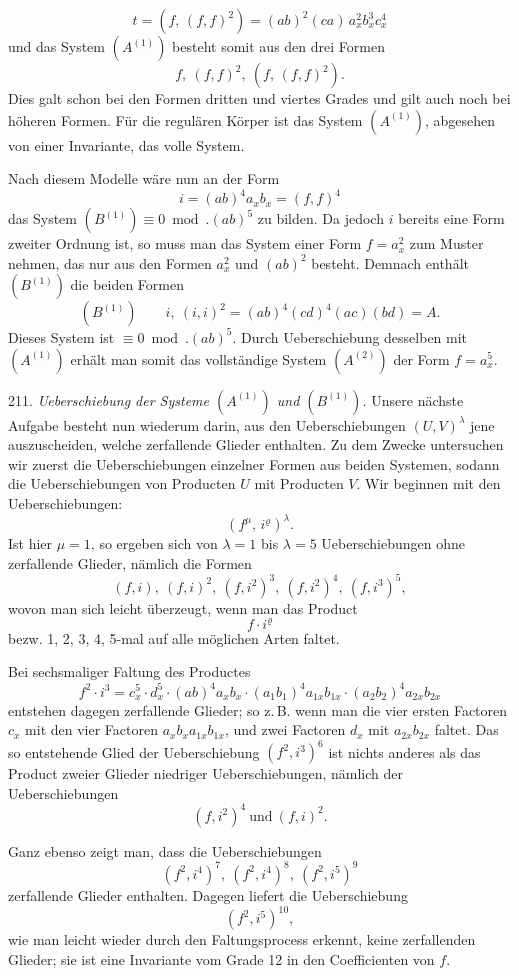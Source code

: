 \[
t = (f,\, (f,f)^2) = (ab)^2(ca)\, a_x^2 b_x^3 c_x^4
\]
und das System $(A^{(1)})$ besteht somit aus den drei Formen
\[
f,\ (f,f)^2,\ (f,\,(f,f)^2).
\]
Dies galt schon bei den Formen dritten und viertes Grades und %
gilt auch noch bei h\"oheren Formen. F\"ur die regul\"aren K\"orper ist
das System $(A^{(1)})$, abgesehen von einer Invariante, das volle System.

Nach diesem Modelle w\"are nun an der Form
\[
i = (ab)^4 a_x b_x = (f,f)^4
\]
das System $(B^{(1)}) \equiv 0 \bmod. (ab)^5$ zu bilden. Da jedoch $i$ bereits eine
Form zweiter Ordnung ist, so muss man das System einer Form
$f = a_x^2$ zum Muster nehmen, das nur aus den Formen $a_x^2$ und $(ab)^2$
besteht. Demnach enth\"alt $(B^{(1)})$ die beiden Formen
\[
(B^{(1)}) \qquad i,\ (i,i)^2 = (ab)^4(cd)^4(ac)(bd) = A.
\]
Dieses System ist $\equiv 0 \bmod. (ab)^5$. Durch Ueberschiebung desselben
 mit $(A^{(1)})$ erh\"alt man somit das vollst\"andige System $(A^{(2)})$ der
Form $f = a_x^5$.

211. \textit{Ueberschiebung der Systeme $(A^{(1)})$ und $(B^{(1)})$.} Unsere n\"achste
Aufgabe besteht nun wiederum darin, aus den Ueberschiebungen
$(U,V)^\lambda$ jene auszuscheiden, welche zerfallende Glieder enthalten. Zu
dem Zwecke untersuchen wir zuerst die Ueberschiebungen einzelner
Formen aus beiden Systemen, sodann die Ueberschiebungen von Producten
 $U$ mit Producten $V$. Wir beginnen mit den Ueberschiebungen:
\[
(f^\mu,\, i^\varrho)^\lambda.
\]
Ist hier $\mu = 1$, so ergeben sich von $\lambda = 1$ bis $\lambda = 5$ Ueberschiebungen
 ohne zerfallende Glieder, n\"amlich die Formen
\[
(f,i),\ (f,i)^2,\ (f,i^2)^3,\ (f,i^2)^4,\ (f,i^3)^5,
\]
wovon man sich leicht \"uberzeugt, wenn man das Product
\[
f \cdot i^\varrho
\]
bezw. 1, 2, 3, 4, 5-mal auf alle m\"oglichen Arten faltet.

Bei sechsmaliger Faltung des Productes
\[
f^2 \cdot i^3 = c_x^5 \cdot d_x^5 \cdot (ab)^4 a_x b_x \cdot (a_1 b_1)^4 a_{1x} b_{1x} \cdot (a_2 b_2)^4 a_{2x} b_{2x}
\]
entstehen dagegen zerfallende Glieder; so z.\,B. wenn man die vier ersten
Factoren $c_x$ mit den vier Factoren $a_x b_x a_{1x} b_{1x}$, und zwei Factoren $d_x$
mit $a_{2x} b_{2x}$ faltet. Das so entstehende Glied der Ueberschiebung
$(f^2, i^3)^6$ ist nichts anderes als das Product zweier Glieder niedriger
Ueberschiebungen, n\"amlich der Ueberschiebungen
\[
(f, i^2)^4 \ \text{und}\ (f, i)^2.
\]


Ganz ebenso zeigt man, dass die Ueberschiebungen
\[
(f^2, i^4)^7,\ (f^2, i^4)^8,\ (f^2, i^5)^9
\]
zerfallende Glieder enthalten. Dagegen liefert die Ueberschiebung
\[
(f^2, i^5)^{10},
\]
wie man leicht wieder durch den Faltungsprocess erkennt, keine zerfallenden
 Glieder; sie ist eine Invariante vom Grade 12 in den Coefficienten
 von $f$.


